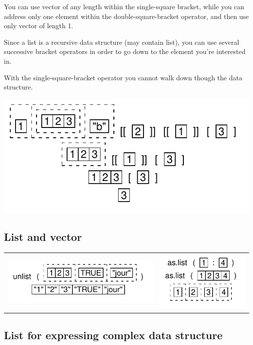 \documentclass[pdflatex]{article}
\begin{document}
You can use vector of any length within the single-square bracket, while you can address only one element within the double-square-bracket operator, and then use only vector of length 1.

Since a list is a recursive data structure (may contain list), you can use several successive bracket operators in order to go down to the element you're interested in.

With the single-square-bracket operator you cannot walk down though the data structure.

\includegraphics{list_successive_extraction}

\subsection{List and vector}

\begin{tabular}{cc}
\includegraphics{unlist} & \includegraphics{aslist}
\end{tabular}


\subsection{List for expressing complex data structure}
\end{document}
